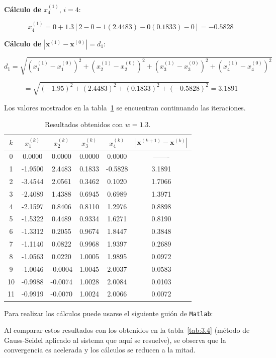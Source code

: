 \documentclass[12pt,letterpaper]{article}
\theoremstyle{definition}
\theoremstyle{plain}
\theoremstyle{remark}
\begin{document}
\textbf{Cálculo de } $x_4^{(1)}$, $i = 4$:

\[
x_4^{(1)} = 0 + 1.3 \left[ 2 - 0 - 1(2.4483) - 0(0.1833) - 0 \right] = -0.5828
\]

\textbf{Cálculo de } $|\mathbf{x}^{(1)} - \mathbf{x}^{(0)}| = d_1$:

\[
d_1 = \sqrt{(x_1^{(1)} - x_1^{(0)})^2 + (x_2^{(1)} - x_2^{(0)})^2 + (x_3^{(1)} - x_3^{(0)})^2 + (x_4^{(1)} - x_4^{(0)})^2}
\]

\[
= \sqrt{(-1.95)^2 + (2.4483)^2 + (0.1833)^2 + (-0.5828)^2} = 3.1891
\]

Los valores mostrados en la tabla~\ref{tab:3.5} se encuentran continuando las iteraciones.

\begin{table}[h!]
\centering
\caption{Resultados obtenidos con $w = 1.3$.}
\label{tab:3.5}
\begin{tabular}{c|c c c c|c}
$k$ & $x_1^{(k)}$ & $x_2^{(k)}$ & $x_3^{(k)}$ & $x_4^{(k)}$ & $|\mathbf{x}^{(k+1)} - \mathbf{x}^{(k)}|$ \\
\hline
0 & 0.0000 & 0.0000 & 0.0000 & 0.0000 & ------- \\
1 & -1.9500 & 2.4483 & 0.1833 & -0.5828 & 3.1891 \\
2 & -3.4544 & 2.0561 & 0.3462 & 0.1020 & 1.7066 \\
3 & -2.4089 & 1.4388 & 0.6945 & 0.6989 & 1.3971 \\
4 & -2.1597 & 0.8406 & 0.8110 & 1.2976 & 0.8898 \\
5 & -1.5322 & 0.4489 & 0.9334 & 1.6271 & 0.8190 \\
6 & -1.3312 & 0.2055 & 0.9674 & 1.8447 & 0.3848 \\
7 & -1.1140 & 0.0822 & 0.9968 & 1.9397 & 0.2689 \\
8 & -1.0563 & 0.0220 & 1.0005 & 1.9895 & 0.0972 \\
9 & -1.0046 & -0.0004 & 1.0045 & 2.0037 & 0.0583 \\
10 & -0.9988 & -0.0074 & 1.0028 & 2.0084 & 0.0103 \\
11 & -0.9919 & -0.0070 & 1.0024 & 2.0066 & 0.0072
\end{tabular}
\end{table}

\vspace{1em}
\noindent
Para realizar los cálculos puede usarse el siguiente guión de \texttt{Matlab}:



Al comparar estos resultados con los obtenidos en la tabla~\ref{tab:3.4} (método de Gauss-Seidel aplicado al sistema que aquí se resuelve), se observa que la convergencia es acelerada y los cálculos se reducen a la mitad.
\end{document}
